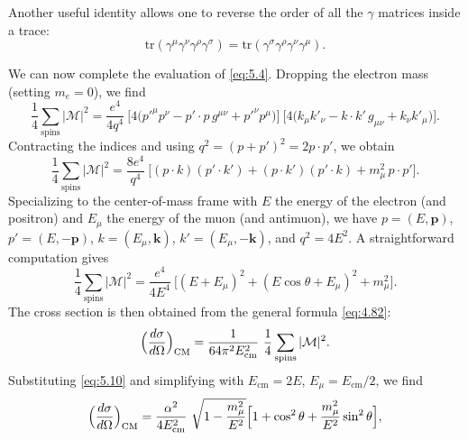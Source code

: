 Another useful identity allows one to reverse the order of all the $\gamma$
matrices inside a trace:
\begin{equation}
  \mathrm{tr}(\gamma^\mu\gamma^\nu\gamma^\rho\gamma^\sigma)
    = \mathrm{tr}(\gamma^\sigma\gamma^\rho\gamma^\nu\gamma^\mu) .
  \label{eq:5.7}
\end{equation}

We can now complete the evaluation of \eqref{eq:5.4}.  Dropping the electron
mass (setting $m_e = 0$), we find
\begin{equation}
  \frac{1}{4}\sum_{\text{spins}}|\mathcal{M}|^2
    = \frac{e^4}{4q^4}\ \bigl[ 4\bigl( p'^{\mu}p^{\nu} - p'\cdot p\,g^{\mu\nu}
      + p'^{\nu}p^{\mu} \bigr) \bigr]\ \bigl[ 4\bigl( k_\mu k'_\nu
        - k\cdot k'\,g_{\mu\nu} + k_\nu k'_\mu \bigr) \bigr].
  \label{eq:5.8}
\end{equation}
Contracting the indices and using $q^2 = (p+p')^2 = 2p\cdot p'$, we obtain
\begin{equation}
  \frac{1}{4}\sum_{\text{spins}}|\mathcal{M}|^2
    = \frac{8e^4}{q^4}\ \bigl[ (p\cdot k)(p'\cdot k') + (p\cdot k')(p'\cdot k)
      + m_\mu^2\,p\cdot p' \bigr] .
  \label{eq:5.9}
\end{equation}
Specializing to the center-of-mass frame with $E$ the energy of the electron
(and positron) and $E_\mu$ the energy of the muon (and antimuon), we have
$p = (E, \mathbf{p})$, $p' = (E, -\mathbf{p})$, $k = (E_\mu, \mathbf{k})$,
$k' = (E_\mu, -\mathbf{k})$, and $q^2 = 4E^2$.  A straightforward computation
gives
\begin{equation}
  \frac{1}{4}\sum_{\text{spins}}|\mathcal{M}|^2
    = \frac{e^4}{4E^4}\ \bigl[ (E + E_\mu)^2 + (E\cos\theta + E_\mu)^2
      + m_\mu^2 \bigr] .
  \label{eq:5.10}
\end{equation}
The cross section is then obtained from the general formula
\eqref{eq:4.82}:
\begin{equation}
  \Bigl( \frac{d\sigma}{d\Omega} \Bigr)_{\mathrm{CM}}
    = \frac{1}{64\pi^2 E_{\mathrm{cm}}^2}\ \frac{1}{4}
      \sum_{\text{spins}}|\mathcal{M}|^2 .
  \label{eq:5.11}
\end{equation}
Substituting \eqref{eq:5.10} and simplifying with
$E_{\mathrm{cm}} = 2E$, $E_\mu = E_{\mathrm{cm}}/2$, we find
\begin{equation}
  \Bigl( \frac{d\sigma}{d\Omega} \Bigr)_{\mathrm{CM}}
    = \frac{\alpha^2}{4E_{\mathrm{cm}}^2}\ \sqrt{1 - \frac{m_\mu^2}{E^2}}
      \Bigl[ 1 + \cos^2\theta + \frac{m_\mu^2}{E^2}\sin^2\theta \Bigr] ,
  \label{eq:5.12}
\end{equation}
